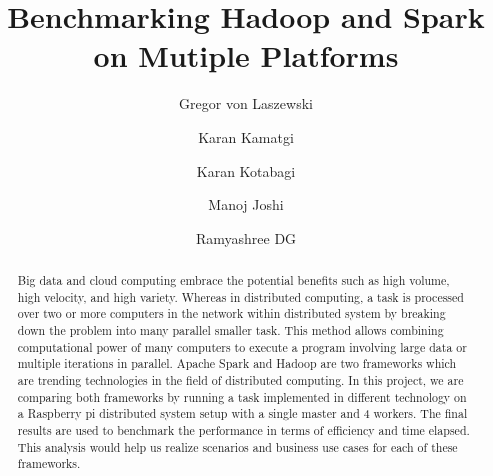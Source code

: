 
\title{Benchmarking Hadoop and Spark on Mutiple Platforms}

\author{Gregor von Laszewski}

\author{Karan Kamatgi}

\author{Karan Kotabagi}

\author{Manoj Joshi}

\author{Ramyashree DG}

\renewcommand{\shortauthors}{G. v. Laszewski, Karan Kamatgi, 
  Karan Kotabagi, Manoj Joshi, Ramyashree DG}
  
\begin{abstract}

Big data and cloud computing embrace the potential benefits such as 
high volume, high velocity, and high variety. Whereas in distributed computing, 
a task is processed over two or more computers in the network within distributed 
system by breaking down the problem into many parallel smaller task. This 
method allows combining computational power of many computers to execute a 
program involving large data or multiple iterations in parallel. Apache Spark 
and Hadoop are two frameworks which are trending technologies in the field of 
distributed computing. In this project, we are comparing both frameworks by 
running a task implemented in different technology on a Raspberry pi 
distributed system setup with a single master and 4 workers. The final results 
are used to benchmark the performance in terms of efficiency and time elapsed. 
This analysis would help us realize scenarios and business use cases for each 
of these frameworks.


\end{abstract}


